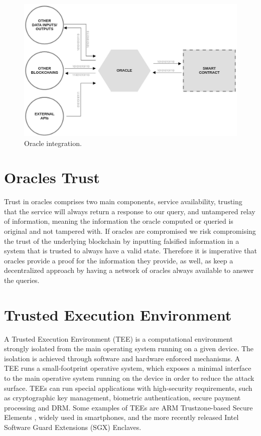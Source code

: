 \begin{figure}[t]
  \begin{center}
    \leavevmode
    \includegraphics[width=\textwidth]{figures/oracle.jpg}
    \caption{Oracle integration.}
    \label{fig:/figures/oracle.jpg}
  \end{center}
\end{figure}


\section{Oracles Trust}
Trust in oracles comprises two main components, service availability, trusting that the service will always return a response to our query, and untampered relay of information, meaning the information the oracle computed or queried is original and not tampered with. If oracles are compromised we risk compromising the trust of the underlying blockchain by inputting falsified information in a system that is trusted to always have a valid state. Therefore it is imperative that oracles provide a proof for the information they provide, as well, as keep a decentralized approach by having a network of oracles always available to answer the queries.


\section{Trusted Execution Environment} %
A Trusted Execution Environment (TEE) is a computational environment strongly isolated from the main operating system running on a given device. The isolation is achieved through software and hardware enforced mechanisms. A TEE runs a small-footprint operative system, which exposes a minimal interface to the main operative system running on the device in order to reduce the attack surface. TEEs can run special applications with high-security requirements, such as cryptographic key management, biometric authentication, secure payment processing and DRM. Some examples of TEEs are ARM Trustzone-based Secure Elements , widely used in smartphones, and the more recently released Intel Software Guard Extensions (SGX) Enclaves.


